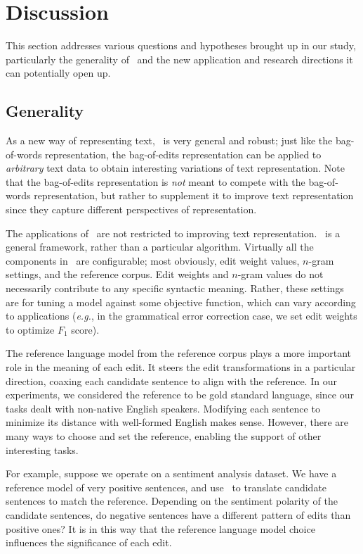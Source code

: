 \section{Discussion}
\label{sec:discuss}

This section addresses various questions and hypotheses brought up in our study,
particularly the generality of \sd~and the new application and research
directions it can potentially open up.

\subsection{Generality}

As a new way of representing text, \sd~is very general and robust; just like the
bag-of-words representation, the bag-of-edits representation can be applied to
{\em arbitrary} text data to obtain interesting variations of text
representation. Note that the bag-of-edits representation is {\em not} meant to
compete with the bag-of-words representation, but rather to supplement it to
improve text representation since they capture different perspectives of
representation.

The applications of \sd~are not restricted to improving text representation.
\sd~is a general framework, rather than a particular algorithm. Virtually all
the components in \sd~are configurable; most obviously, edit weight values,
$n$-gram settings, and the reference corpus. Edit weights and $n$-gram values do
not necessarily contribute to any specific syntactic meaning. Rather, these
settings are for tuning a model against some objective function, which can vary
according to applications (\emph{e.g.}, in the grammatical error correction
case, we set edit weights to optimize $F_1$ score).

The reference language model from the reference corpus plays a more important
role in the meaning of each edit. It steers the edit transformations in a
particular direction, coaxing each candidate sentence to align with the
reference. In our experiments, we considered the reference to be gold standard
language, since our tasks dealt with non-native English speakers. Modifying each
sentence to minimize its distance with well-formed English makes sense. However,
there are many ways to choose and set the reference, enabling the support of
other interesting tasks.

For example, suppose we operate on a sentiment analysis dataset. We have a
reference model of very positive sentences, and use \sd~to translate candidate
sentences to match the reference. Depending on the sentiment polarity of the
candidate sentences, do negative sentences have a different pattern of edits
than positive ones? It is in this way that the reference language model choice
influences the significance of each edit.

